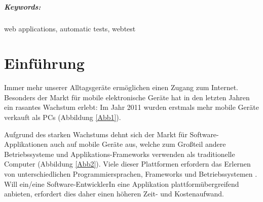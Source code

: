 \documentclass[a4paper,bibtotoc,oneside]{scrbook}
\begin{document}
\vfill
\paragraph*{Keywords:} web applications, automatic tests, webtest
\newpage


\tableofcontents\thispagestyle{empty}
\newpage

\setcounter{page}{1}

\chapter{Einführung}
Immer mehr unserer Alltagsgeräte ermöglichen einen Zugang zum Internet. Besonders der Markt für mobile elektronische Geräte hat in den letzten Jahren ein rasantes Wachstum erlebt: Im Jahr 2011 wurden erstmals mehr mobile Geräte verkauft als PCs (Abbildung \ref{Abb1}).

Aufgrund des starken Wachstums dehnt sich der Markt für Software-Applikationen auch auf mobile Geräte aus, welche zum Großteil andere Betriebssysteme und Applikations-Frameworks verwenden als traditionelle Computer (Abbildung \ref{Abb2}). Viele dieser Plattformen erfordern das Erlernen von unterschiedlichen Programmiersprachen, Frameworks und Betriebssystemen \cite{android}\cite{ios}. Will ein/eine Software-EntwicklerIn eine Applikation plattformübergreifend anbieten, erfordert dies daher einen höheren Zeit- und Kostenaufwand.
\end{document}
